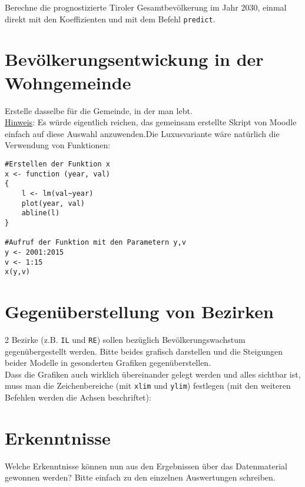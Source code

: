 \documentclass{article}
\begin{document}
Berechne die prognostizierte Tiroler Gesamtbevölkerung im Jahr 2030, einmal direkt mit den Koeffizienten und mit dem Befehl \texttt{predict}.

\section{Bevölkerungsentwickung in der Wohngemeinde}

Erstelle dasselbe für die Gemeinde, in der man lebt. \\

\underline{Hinweis}: Es würde eigentlich reichen, das gemeinsam erstellte Skript von Moodle einfach auf diese Auswahl anzuwenden.Die Luxusvariante wäre natürlich die Verwendung von Funktionen:

\begin{lstlisting}
#Erstellen der Funktion x
x <- function (year, val)
{
	l <- lm(val~year)
	plot(year, val)
	abline(l)
}

#Aufruf der Funktion mit den Parametern y,v
y <- 2001:2015
v <- 1:15
x(y,v)
\end{lstlisting}


\section{Gegenüberstellung von Bezirken}

2 Bezirke (z.B. \texttt{IL} und \texttt{RE})  sollen bezüglich Bevölkerungswachstum gegenübergestellt werden. Bitte beides grafisch darstellen und die Steigungen beider Modelle in gesonderten Grafiken gegenüberstellen.  \\

Dass die Grafiken auch wirklich übereinander gelegt werden und alles sichtbar ist, muss man die Zeichenbereiche (mit \texttt{xlim} und \texttt{ylim}) festlegen (mit den weiteren Befehlen werden die Achsen beschriftet): \\


\section{Erkenntnisse}

Welche Erkenntnisse können nun aus den Ergebnissen über das Datenmaterial gewonnen werden? Bitte einfach zu den einzelnen Auswertungen schreiben.
\end{document}
